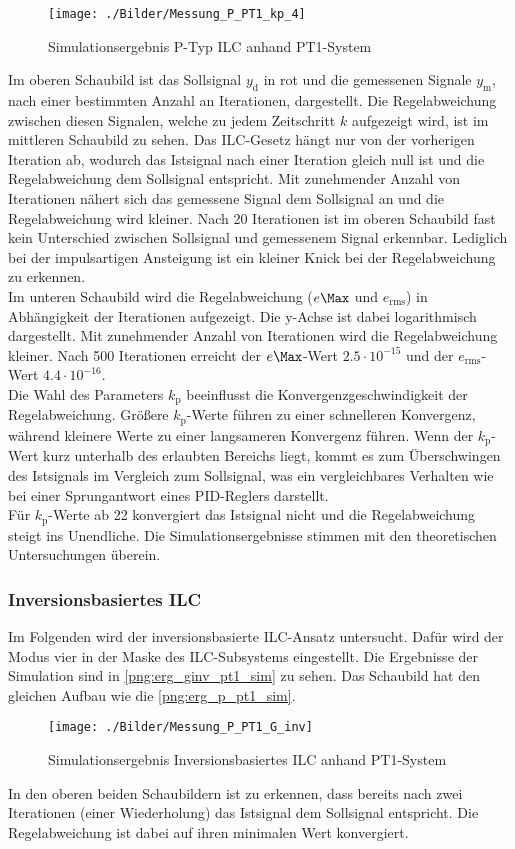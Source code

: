 \begin{figure}[H]
	\centering
	\texttt{[image: ./Bilder/Messung\_P\_PT1\_kp\_4]}
	\caption{Simulationsergebnis P-Typ ILC anhand PT1-System}
	\label{png:erg_p_pt1_sim}
\end{figure}
Im oberen Schaubild ist das Sollsignal $y_\mathrm{d}$ in rot und die gemessenen Signale $y_\mathrm{m}$, nach einer bestimmten Anzahl an Iterationen, dargestellt. Die Regelabweichung zwischen diesen Signalen, welche zu jedem Zeitschritt $k$ aufgezeigt wird, ist im mittleren Schaubild zu sehen. Das ILC-Gesetz hängt nur von der vorherigen Iteration ab, wodurch das Istsignal nach einer Iteration gleich null ist und die Regelabweichung dem Sollsignal entspricht. Mit zunehmender Anzahl von Iterationen nähert sich das gemessene Signal dem Sollsignal an und die Regelabweichung wird kleiner. Nach 20 Iterationen ist im oberen Schaubild fast kein Unterschied zwischen Sollsignal und gemessenem Signal erkennbar. Lediglich bei der impulsartigen Ansteigung ist ein kleiner Knick bei der Regelabweichung zu erkennen.\\
Im unteren Schaubild wird die Regelabweichung ($e\Max$ und $e_{\mathrm{rms}}$) in Abhängigkeit der Iterationen aufgezeigt. Die y-Achse ist dabei logarithmisch dargestellt. Mit zunehmender Anzahl von Iterationen wird die Regelabweichung kleiner. Nach 500 Iterationen erreicht der $e\Max$-Wert $2.5 \cdot 10^{-15}$ und der $e_{\mathrm{rms}}$-Wert $4.4 \cdot 10^{-16}$.\\
Die Wahl des Parameters $k_\mathrm{p}$ beeinflusst die Konvergenzgeschwindigkeit der Regelabweichung. Größere $k_\mathrm{p}$-Werte führen zu einer schnelleren Konvergenz, während kleinere Werte zu einer langsameren Konvergenz führen. Wenn der $k_\mathrm{p}$-Wert kurz unterhalb des erlaubten Bereichs liegt, kommt es zum Überschwingen des Istsignals im Vergleich zum Sollsignal, was ein vergleichbares Verhalten wie bei einer Sprungantwort eines PID-Reglers darstellt.\\
Für $k_\mathrm{p}$-Werte ab 22 konvergiert das Istsignal nicht und die Regelabweichung steigt ins Unendliche. Die Simulationsergebnisse stimmen mit den theoretischen Untersuchungen überein. 

\subsubsection{Inversionsbasiertes ILC}
Im Folgenden wird der inversionsbasierte ILC-Ansatz untersucht. Dafür wird der Modus vier in der Maske des ILC-Subsystems eingestellt. Die Ergebnisse der Simulation sind in \autoref{png:erg_ginv_pt1_sim} zu sehen. Das Schaubild hat den gleichen Aufbau wie die \autoref{png:erg_p_pt1_sim}.
\begin{figure}[H]
	\centering
	\texttt{[image: ./Bilder/Messung\_P\_PT1\_G\_inv]}
	\caption{Simulationsergebnis Inversionsbasiertes ILC anhand PT1-System}
	\label{png:erg_ginv_pt1_sim}
\end{figure}
In den oberen beiden Schaubildern ist zu erkennen, dass bereits nach zwei Iterationen (einer Wiederholung) das Istsignal dem Sollsignal entspricht. Die Regelabweichung ist dabei auf ihren minimalen Wert konvergiert. 

